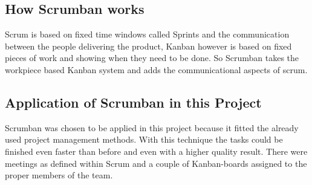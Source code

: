 \subsection{How Scrumban works}
Scrum is based on fixed time windows called Sprints and the communication between the people delivering the product, Kanban however is based on fixed pieces of work and showing when they need to be done. So Scrumban takes the workpiece based Kanban system and adds the communicational aspects of scrum.

\subsection{Application of Scrumban in this Project}
Scrumban was chosen to be applied in this project because it fitted the already used project management methods. With this technique the tasks could be finished even faster than before and even with a higher quality result. There were meetings as defined within Scrum and a couple of Kanban-boards assigned to the proper members of the team.
